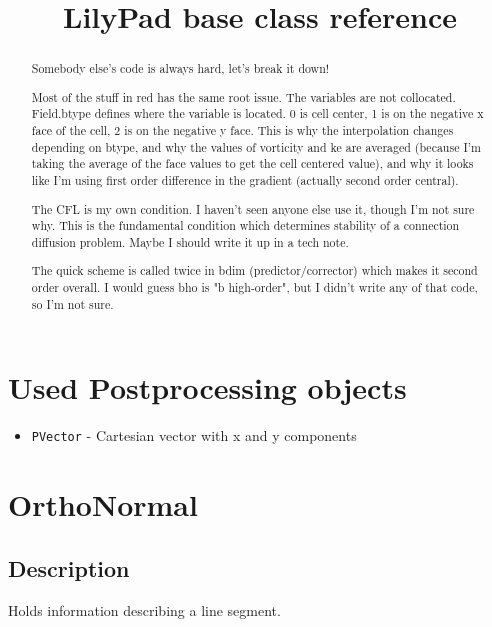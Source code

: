 \documentclass[notitlepage]{article}
\title{LilyPad base class reference}
\begin{document}
\maketitle

\begin{abstract}
Somebody else’s code is always hard, let's break it down!

Most of the stuff in red has the same root issue. The variables are not collocated. Field.btype defines
where the variable is located. 0 is cell center, 1 is on the negative x face of the cell, 2 is on the
negative y face. This is why the interpolation changes depending on btype, and why the values of vorticity
and ke are averaged (because I'm taking the average of the face values to get the cell centered value),
and why it looks like I'm using first order difference in the gradient (actually second order central).

The CFL is my own condition. I haven't seen anyone else use it, though I'm not sure why. This is the
fundamental condition which determines stability of a connection diffusion problem. Maybe I should write it up in a tech note.

The quick scheme is called twice in bdim (predictor/corrector) which makes it second order overall.
I would guess bho is "b high-order", but I didn't write any of that code, so I'm not sure.

\end{abstract}

\section{Used Postprocessing objects}

\begin{itemize}
\item \texttt{PVector} - Cartesian vector with x and y components
\end{itemize}

\section{OrthoNormal}

\subsection{Description}

Holds information describing a line segment.
\end{document}
